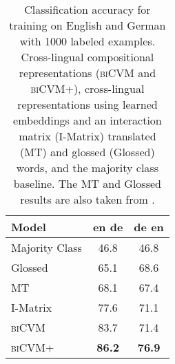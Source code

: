 \documentclass{article} \pdfoutput=1
\newcommand{\biCVM}{\textsc{biCVM}\xspace}
\newcommand{\biCVMplus}{\textsc{biCVM+}\xspace}
\begin{document}
\begin{table}[t]
\centering
\begin{tabular}{lcc}
Model & en  de & de  en \\ \hline
Majority Class & 46.8 & 46.8 \\
Glossed & 65.1 & 68.6 \\
MT & 68.1 & 67.4 \\
I-Matrix & 77.6 & 71.1 \\ \hline
\biCVM & 83.7 & 71.4 \\
\biCVMplus & \textbf{86.2} & \textbf{76.9} \\
\end{tabular}
\caption{Classification accuracy for training on English and German with 1000
  labeled examples. Cross-lingual compositional representations (\biCVM and
  \biCVMplus), cross-lingual representations using learned embeddings and an
  interaction matrix (I-Matrix) \cite{Klementiev:2012} translated (MT) and
  glossed (Glossed) words, and the majority class baseline. The MT and Glossed
  results are also taken from \citet{Klementiev:2012}.}
\label{tab:results1k}
\end{table}

\end{document}
